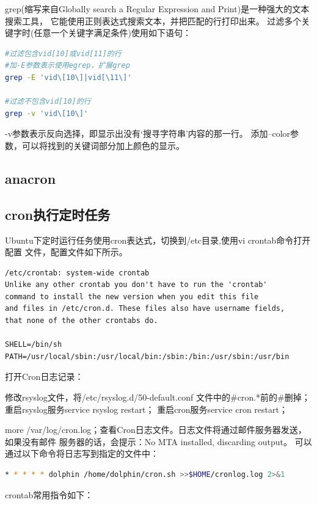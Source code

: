 \documentclass{book}
\begin{document}
grep(缩写来自Globally search a Regular Expression and Print)是一种强大的文本搜索工具，
它能使用正则表达式搜索文本，并把匹配的行打印出来。
过滤多个关键字时(任意一个关键字满足条件)使用如下语句：

\begin{lstlisting}[language=Bash]
#过滤包含vid[10]或vid[11]的行
#加-E参数表示使用egrep，扩展grep
grep -E 'vid\[10\]|vid[\11\]'

#过滤不包含vid[10]的行
grep -v 'vid\[10\]'
\end{lstlisting}

-v参数表示反向选择，即显示出没有‘搜寻字符串’内容的那一行。
添加--color参数，可以将找到的关键词部分加上颜色的显示。

\subsection{anacron}

\subsection{cron执行定时任务}

Ubuntu下定时运行任务使用cron表达式，切换到/etc目录,使用vi crontab命令打开配置
文件，配置文件如下所示。

\begin{lstlisting}
/etc/crontab: system-wide crontab
Unlike any other crontab you don't have to run the 'crontab'
command to install the new version when you edit this file
and files in /etc/cron.d. These files also have username fields,
that none of the other crontabs do.

SHELL=/bin/sh
PATH=/usr/local/sbin:/usr/local/bin:/sbin:/bin:/usr/sbin:/usr/bin
\end{lstlisting}

打开Cron日志记录：

修改rsyslog文件，将/etc/rsyslog.d/50-default.conf 文件中的\#cron.*前的\#删掉；
重启rsyslog服务service rsyslog restart；
重启cron服务service cron restart；

more /var/log/cron.log；查看Cron日志文件。日志文件将通过邮件服务器发送，如果没有邮件
服务器的话，会提示：No MTA installed, discarding output。
可以通过以下命令将日志写到指定的文件中：

\begin{lstlisting}[language=Bash]
* * * * * dolphin /home/dolphin/cron.sh >>$HOME/cronlog.log 2>&1
\end{lstlisting}

crontab常用指令如下：
\end{document}
